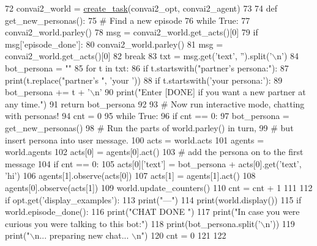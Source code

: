 \begin{DoxyCode}
72     convai2\_world = \hyperlink{namespaceparlai_1_1core_1_1worlds_a11923c10b545c7ecc1b08fe2242d9c2c}{create\_task}(convai2\_opt, convai2\_agent)
73 
74     \textcolor{keyword}{def }get\_new\_personas():
75         \textcolor{comment}{# Find a new episode}
76         \textcolor{keywordflow}{while} \textcolor{keyword}{True}:
77             convai2\_world.parley()
78             msg = convai2\_world.get\_acts()[0]
79             \textcolor{keywordflow}{if} msg[\textcolor{stringliteral}{'episode\_done'}]:
80                 convai2\_world.parley()
81                 msg = convai2\_world.get\_acts()[0]
82                 \textcolor{keywordflow}{break}
83         txt = msg.get(\textcolor{stringliteral}{'text'}, \textcolor{stringliteral}{''}).split(\textcolor{stringliteral}{'\(\backslash\)n'})
84         bot\_persona = \textcolor{stringliteral}{""}
85         \textcolor{keywordflow}{for} t \textcolor{keywordflow}{in} txt:
86             \textcolor{keywordflow}{if} t.startswith(\textcolor{stringliteral}{"partner's persona:"}):
87                 print(t.replace(\textcolor{stringliteral}{"partner's "}, \textcolor{stringliteral}{'your '}))
88             \textcolor{keywordflow}{if} t.startswith(\textcolor{stringliteral}{'your persona:'}):
89                 bot\_persona += t + \textcolor{stringliteral}{'\(\backslash\)n'}
90         print(\textcolor{stringliteral}{"Enter [DONE] if you want a new partner at any time."})
91         \textcolor{keywordflow}{return} bot\_persona
92 
93     \textcolor{comment}{# Now run interactive mode, chatting with personas!}
94     cnt = 0
95     \textcolor{keywordflow}{while} \textcolor{keyword}{True}:
96         \textcolor{keywordflow}{if} cnt == 0:
97             bot\_persona = get\_new\_personas()
98         \textcolor{comment}{# Run the parts of world.parley() in turn,}
99         \textcolor{comment}{# but insert persona into user message.}
100         acts = world.acts
101         agents = world.agents
102         acts[0] = agents[0].act()
103         \textcolor{comment}{# add the persona on to the first message}
104         \textcolor{keywordflow}{if} cnt == 0:
105             acts[0][\textcolor{stringliteral}{'text'}] = bot\_persona + acts[0].get(\textcolor{stringliteral}{'text'}, \textcolor{stringliteral}{'hi'})
106         agents[1].observe(acts[0])
107         acts[1] = agents[1].act()
108         agents[0].observe(acts[1])
109         world.update\_counters()
110         cnt = cnt + 1
111 
112         \textcolor{keywordflow}{if} opt.get(\textcolor{stringliteral}{'display\_examples'}):
113             print(\textcolor{stringliteral}{"---"})
114             print(world.display())
115         \textcolor{keywordflow}{if} world.episode\_done():
116             print(\textcolor{stringliteral}{"CHAT DONE "})
117             print(\textcolor{stringliteral}{"In case you were curious you were talking to this bot:"})
118             print(bot\_persona.split(\textcolor{stringliteral}{'\(\backslash\)n'}))
119             print(\textcolor{stringliteral}{"\(\backslash\)n... preparing new chat... \(\backslash\)n"})
120             cnt = 0
121 
122 
\end{DoxyCode}
